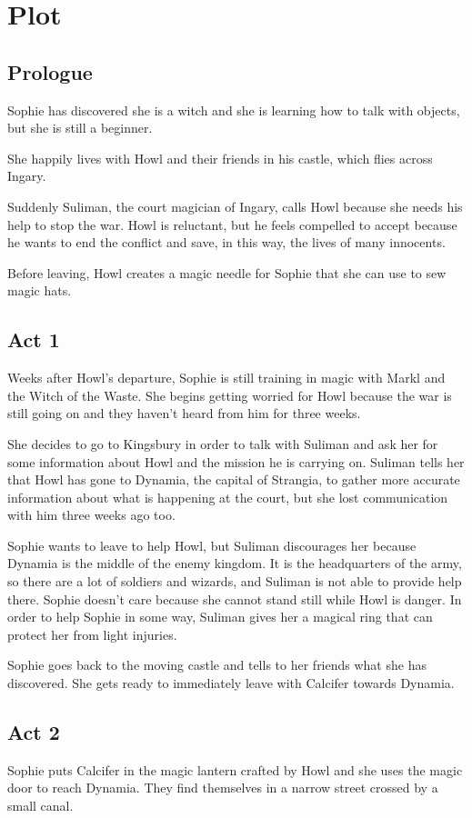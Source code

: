 \section{Plot}

\subsection*{Prologue}
Sophie has discovered she is a witch and she is learning how to talk with objects, but she is still a beginner.

She happily lives with Howl and their friends in his castle, which flies across Ingary.

Suddenly Suliman, the court magician of Ingary, calls Howl because she needs his help to stop the war. Howl is reluctant, but he feels compelled to accept because he wants to end the conflict and save, in this way, the lives of many innocents.

Before leaving, Howl creates a magic needle for Sophie that she can use to sew magic hats.

\subsection*{Act 1}
Weeks after Howl's departure, Sophie is still training in magic with Markl and the Witch of the Waste. She begins getting worried for Howl because the war is still going on and they haven't heard from him for three weeks.

She decides to go to Kingsbury in order to talk with Suliman and ask her for some information about Howl and the mission he is carrying on. Suliman tells her that Howl has gone to Dynamia, the capital of Strangia, to gather more accurate information about what is happening at the court, but she lost communication with him three weeks ago too.

Sophie wants to leave to help Howl, but Suliman discourages her because Dynamia is the middle of the enemy kingdom. It is the headquarters of the army, so there are a lot of soldiers and wizards, and Suliman is not able to provide help there. Sophie doesn't care because she cannot stand still while Howl is danger. In order to help Sophie in some way, Suliman gives her a magical ring that can protect her from light injuries.

Sophie goes back to the moving castle and tells to her friends what she has discovered. She gets ready to immediately leave with Calcifer towards Dynamia.

\subsection*{Act 2}
Sophie puts Calcifer in the magic lantern crafted by Howl and she uses the magic door to reach Dynamia. They find themselves in a narrow street crossed by a small canal.

